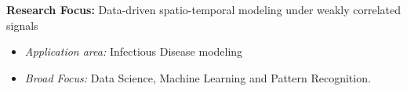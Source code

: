 \par{\textbf{Research Focus: } Data-driven spatio-temporal modeling under weakly correlated signals\vspace{0.5em}
\begin{itemize}
  \item \textit{Application area:} Infectious Disease modeling\\
  \item \textit{Broad Focus:} Data Science, Machine Learning and Pattern Recognition.\\
\end{itemize}
}
\vspace{1em}
\iffalse
